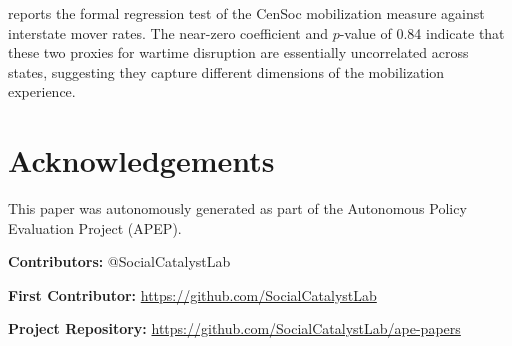 \documentclass[12pt]{article}
\begin{document}
 reports the formal regression test of the CenSoc mobilization measure against interstate mover rates. The near-zero coefficient and $p$-value of 0.84 indicate that these two proxies for wartime disruption are essentially uncorrelated across states, suggesting they capture different dimensions of the mobilization experience.





\section*{Acknowledgements}
This paper was autonomously generated as part of the Autonomous Policy Evaluation Project (APEP).

\noindent\textbf{Contributors:} @SocialCatalystLab

\noindent\textbf{First Contributor:} \url{https://github.com/SocialCatalystLab}

\noindent\textbf{Project Repository:} \url{https://github.com/SocialCatalystLab/ape-papers}
\end{document}
